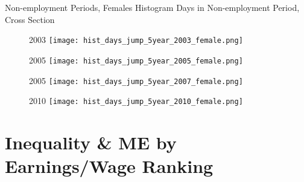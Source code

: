 \documentclass[hyperref={bookmarks=false}]{beamer}
\begin{document}
\begin{appendix}
\begin{frame}{Non-employment Periods, Females}
Histogram Days in Non-employment Period, Cross Section
\begin{figure}[!t]
\centering
\begin{minipage}[b]{0.30\textwidth}{2003}
\centering
\texttt{[image: hist\_days\_jump\_5year\_2003\_female.png]}
\end{minipage}
\begin{minipage}[b]{0.30\textwidth}{2005}
\centering
\texttt{[image: hist\_days\_jump\_5year\_2005\_female.png]}
\end{minipage}
\begin{minipage}[b]{0.30\textwidth}{2005}
\centering
\texttt{[image: hist\_days\_jump\_5year\_2007\_female.png]}
\end{minipage}
\begin{minipage}[b]{0.30\textwidth}{2010}
\centering
\texttt{[image: hist\_days\_jump\_5year\_2010\_female.png]}
\end{minipage}
\end{figure}
\hyperlink{DATA}{}
\end{frame}

\section{Inequality \& ME by Earnings/Wage Ranking}
\subsection{}

\begin{frame}
\label{RANK}
\end{frame}


\end{appendix}
\end{document}
